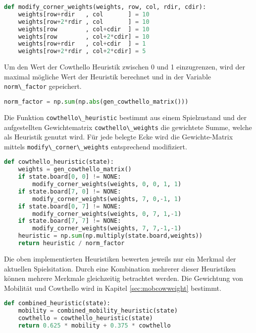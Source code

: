 \begin{lstlisting}[language=Python]
def modify_corner_weights(weights, row, col, rdir, cdir):
    weights[row+rdir   , col       ] = 10
    weights[row+2*rdir , col       ] = 10
    weights[row        , col+cdir  ] = 10
    weights[row        , col+2*cdir] = 10
    weights[row+rdir   , col+cdir  ] = 1
    weights[row+2*rdir , col+2*cdir] = 5
\end{lstlisting}

Um den Wert der Cowthello Heuristik zwischen 0 und 1 einzugrenzen, wird
der maximal mögliche Wert der Heuristik berechnet und in der Variable
\passthrough{\lstinline!norm\_factor!} gepeichert.

\begin{lstlisting}[language=Python]
norm_factor = np.sum(np.abs(gen_cowthello_matrix()))
\end{lstlisting}

Die Funktion \passthrough{\lstinline!cowthello\_heuristic!} bestimmt aus
einem Spielzustand und der aufgestellten Gewichtematrix
\passthrough{\lstinline!cowthello\_weights!} die gewichtete Summe,
welche als Heuristik genutzt wird. Für jede belegte Ecke wird die
Gewichte-Matrix mittels
\passthrough{\lstinline!modify\_corner\_weights!} entsprechend
modifiziert.

\begin{lstlisting}[language=Python]
def cowthello_heuristic(state):
    weights = gen_cowthello_matrix()
    if state.board[0, 0] != NONE:
        modify_corner_weights(weights, 0, 0, 1, 1)
    if state.board[7, 0] != NONE:
        modify_corner_weights(weights, 7, 0,-1, 1)
    if state.board[0, 7] != NONE:
        modify_corner_weights(weights, 0, 7, 1,-1)
    if state.board[7, 7] != NONE:
        modify_corner_weights(weights, 7, 7,-1,-1)
    heuristic = np.sum(np.multiply(state.board,weights))
    return heuristic / norm_factor
\end{lstlisting}

Die oben implementierten Heuristiken bewerten jeweils nur ein Merkmal
der aktuellen Spielsitation. Durch eine Kombination mehrerer dieser
Heuristiken können mehrere Merkmale gleichzeitig betrachtet werden. Die
Gewichtung von Mobilität und Cowthello wird in Kapitel
\ref{sec:mobcowweight} bestimmt.

\begin{lstlisting}[language=Python]
def combined_heuristic(state):
    mobility = combined_mobility_heuristic(state)
    cowthello = cowthello_heuristic(state)
    return 0.625 * mobility + 0.375 * cowthello
\end{lstlisting}

